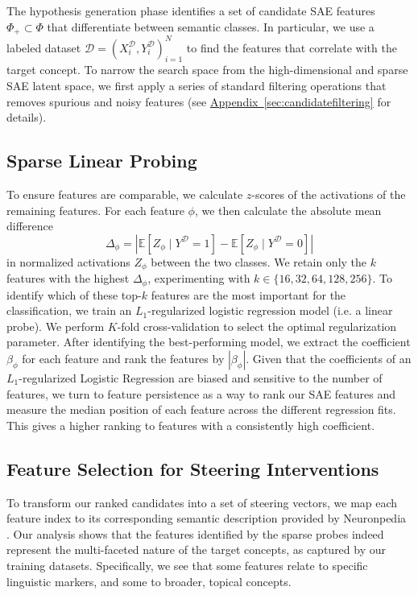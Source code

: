 \documentclass{article}
\theoremstyle{plain}
\theoremstyle{definition}
\theoremstyle{remark}
\newcommand{\myref}[2]{%
    \hyperref[#2]{#1~\ref*{#2}}%
}
\begin{document}
The hypothesis generation phase identifies a set of candidate SAE features $\Phi_+ \subset \Phi$ that differentiate between semantic classes. In particular, we use a labeled dataset $\mathcal{D} = {(X_i^\mathcal{D}, Y_i^\mathcal{D})}_{i=1}^{N}$ to find the features that correlate with the target concept. To narrow the search space from the high-dimensional and sparse SAE latent space, we first apply a series of standard filtering operations that removes spurious and noisy features (see \myref{Appendix}{sec:candidatefiltering} for details).

\subsection{Sparse Linear Probing}

To ensure features are comparable, we calculate $z$-scores of the activations of the remaining features.
For each feature $\phi$, we then calculate the absolute mean difference
\begin{equation}
\Delta_\phi = |\mathbb{E}[Z_\phi \mid Y^{\mathcal{D}}{=}1] - \mathbb{E}[Z_\phi \mid Y^{\mathcal{D}}{=}0]|
\end{equation}
in normalized activations $Z_\phi$ between the two classes.
We retain only the $k$ features with the highest $\Delta_\phi$, experimenting with $k \in \{16, 32, 64, 128, 256\}$.
To identify which of these top-$k$ features are the most important for the classification, we train an $L_1$-regularized logistic regression model (i.e. a linear probe). We perform $K$-fold cross-validation to select the optimal regularization parameter. After identifying the best-performing model, we extract the coefficient $\beta_\phi$ for each feature and rank the features by $|\beta_\phi|$. Given that the coefficients of an $L_1$-regularized Logistic Regression are biased and sensitive to the number of features, we turn to feature persistence as a way to rank our SAE features and measure the median position of each feature across the different regression fits. This gives a higher ranking to features with a consistently high coefficient.

\subsection{Feature Selection for Steering Interventions}

To transform our ranked candidates into a set of steering vectors, we map each feature index to its corresponding semantic description provided by Neuronpedia \cite{neuronpedia}. Our analysis shows that the features identified by the sparse probes indeed represent the multi-faceted nature of the target concepts, as captured by our training datasets. Specifically, we see that some features relate to specific linguistic markers, and some to broader, topical concepts.
\end{document}
